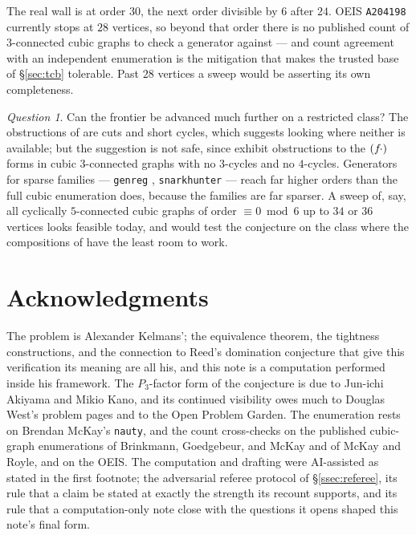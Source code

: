 \documentclass[11pt]{amsart}
\theoremstyle{plain}
\theoremstyle{definition}
\theoremstyle{remark}
\newtheorem{question}[theorem]{Question}
\begin{document}
The real wall is at order $30$, the next order divisible by $6$ after
$24$. OEIS \texttt{A204198} currently stops at $28$ vertices, so beyond
that order there is no published count of $3$-connected cubic graphs to
check a generator against --- and count agreement with an independent
enumeration is the mitigation that makes the trusted base of
\S\ref{sec:tcb} tolerable. Past $28$ vertices a sweep would be asserting
its own completeness.

\begin{question}\label{q:restricted}
Can the frontier be advanced much further on a restricted class? The
obstructions of \cite[(r1)--(r4)]{Kel11} are cuts and short cycles, which
suggests looking where neither is available; but the suggestion is not
safe, since \cite[(r5), (r6)]{Kel11} exhibit obstructions to the
$(f\mkern-2mu\cdot)$ forms in cubic $3$-connected graphs with no
$3$-cycles and no $4$-cycles. Generators for sparse families ---
\texttt{genreg} \cite{genreg},
\texttt{snarkhunter} \cite{BGM11} --- reach far higher orders than the
full cubic enumeration does, because the families are far sparser.
A sweep of, say, all cyclically $5$-connected cubic graphs of order
$\equiv 0 \bmod 6$ up to $34$ or $36$ vertices looks feasible today, and
would test the conjecture on the class where the compositions of
\cite[\S2]{Kel11} have the least room to work.
\end{question}

\section*{Acknowledgments}

The problem is Alexander Kelmans'; the equivalence theorem, the tightness
constructions, and the connection to Reed's domination conjecture that
give this verification its meaning are all his, and this note is a
computation performed inside his framework. The $P_3$-factor form of the
conjecture is due to Jun-ichi Akiyama and Mikio Kano, and its continued
visibility owes much to Douglas West's problem pages and to the Open
Problem Garden. The enumeration rests on Brendan McKay's \texttt{nauty},
and the count cross-checks on the published cubic-graph enumerations of
Brinkmann, Goedgebeur, and McKay and of McKay and Royle, and on the OEIS.
The computation and drafting were AI-assisted as stated in the first
footnote; the adversarial referee protocol of \S\ref{ssec:referee}, its
rule that a claim be stated at exactly the strength its recount supports,
and its rule that a computation-only note close with the questions it
opens shaped this note's final form.
\end{document}
